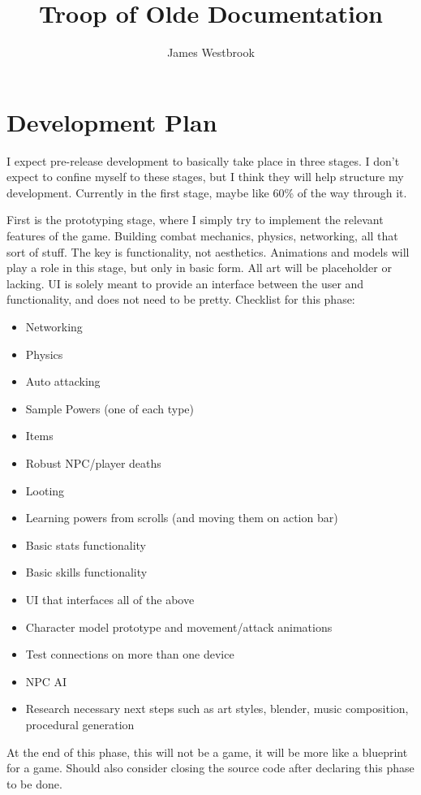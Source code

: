 \documentclass{article}
\title{Troop of Olde Documentation}
\author{James Westbrook}
\begin{document}
\maketitle

\tableofcontents

\pagebreak

\section{Development Plan}
I expect pre-release development to basically take place in three stages.
I don't expect to confine
myself to these stages, but I think they will help structure my development. Currently
in the first stage, maybe like 60\% of the way through it.

First is the prototyping stage, where I simply try to implement the relevant features
of the game. Building combat mechanics, physics, networking, all that sort of stuff.
The key is functionality, not aesthetics. Animations and models will play a role in this stage,
but only in basic form. All art will be placeholder or lacking. UI is solely meant to provide an
interface between the user and functionality, and does not need to be pretty.
Checklist for this phase:
\begin{itemize}
    \item Networking
    \item Physics
    \item Auto attacking
    \item Sample Powers (one of each type)
    \item Items
    \item Robust NPC/player deaths
    \item Looting
    \item Learning powers from scrolls (and moving them on action bar)
    \item Basic stats functionality
    \item Basic skills functionality
    \item UI that interfaces all of the above
    \item Character model prototype and movement/attack animations
    \item Test connections on more than one device
    \item NPC AI
    \item Research necessary next steps such as art styles, blender,
    music composition, procedural generation
\end{itemize}
At the end of this phase, this will not be a game, it will be more like a blueprint for a game.
Should also consider closing the source code after declaring this phase to be done.
\end{document}
